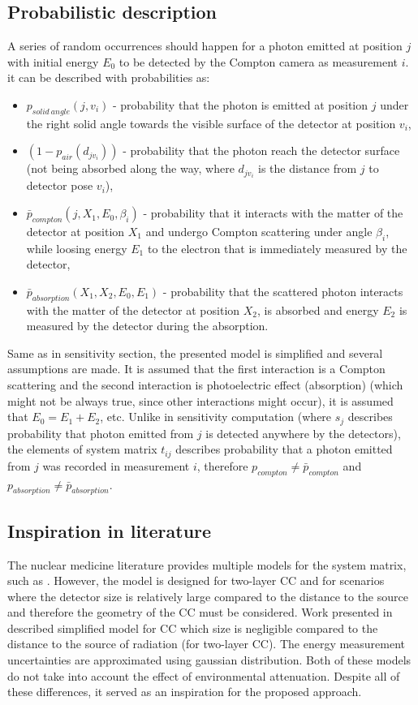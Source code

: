 \subsection{Probabilistic description}
A series of random occurrences should happen for a photon emitted at position $j$ with initial energy $E_{0}$ to be detected by the Compton camera as measurement $i$.
it can be described with probabilities as:
\begin{itemize}
  \item $p_{solid\ angle}(j, v_{i}) $ - probability that the photon is emitted at position $j$ under the right solid angle towards the visible surface of the detector at position $v_{i}$,
  \item $(1-p_{air}(d_{jv_{i}}))$ - probability that the photon reach the detector surface (not being absorbed along the way, where $d_{jv_{i}}$ is the distance from $j$ to detector pose $v_{i}$),
  \item $\bar{p}_{compton}(j, X_{1}, E_{0}, \beta_{i})$ - probability that it interacts with the matter of the detector at position $X_{1}$ and undergo Compton scattering under angle $\beta_{i}$, while loosing energy $E_{1}$ to the electron that is immediately measured by the detector,
  \item $\bar{p}_{absorption}(X_{1}, X_{2}, E_{0}, E_{1})$ - probability that the scattered photon interacts with the matter of the detector at position $X_{2}$, is absorbed and energy $E_{2}$ is measured by the detector during the absorption.
\end{itemize}
Same as in sensitivity section, the presented model is simplified and several assumptions are made. 
It is assumed that the first interaction is a Compton scattering and the second interaction is photoelectric effect (absorption) (which might not be always true, since other interactions might occur), it is assumed that $E_{0} = E_{1} + E_{2}$, etc.
Unlike in sensitivity computation (where $s_{j}$ describes probability that photon emitted from $j$ is detected anywhere by the detectors), the elements of system matrix $t_{ij}$ describes probability that a photon emitted from $j$ was recorded in measurement $i$, therefore $p_{compton}\neq \bar{p}_{compton}$ and  $p_{absorption}\neq \bar{p}_{absorption}$.

\subsection{Inspiration in literature}
The nuclear medicine literature provides multiple models for the system matrix, such as \cite{wilderman}. 
However, the model is designed for two-layer \ac{CC} and for scenarios where the detector size is relatively large compared to the distance to the source and therefore the geometry of the \ac{CC} must be considered.
Work presented in \cite{maxim2016} described simplified model for \ac{CC} which size is negligible compared to the distance to the source of radiation (for two-layer \ac{CC}).
The energy measurement uncertainties are approximated using gaussian distribution.
Both of these models do not take into account the effect of environmental attenuation.
Despite all of these differences, it served as an inspiration for the proposed approach.

